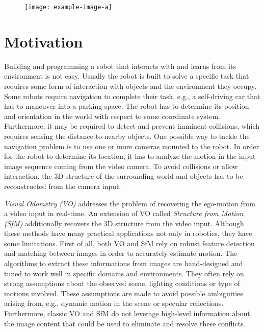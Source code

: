 	
	\begin{figure}
		\centering
		\texttt{[image: example-image-a]}
		\caption{\label{fig:sfm-example}}
	\end{figure}
		
	\section{Motivation}
		
		Building and programming a robot that interacts with and learns from its environment is not easy.
		Usually the robot is built to solve a specific task that requires some form of interaction with objects and the environment they occupy.
		Some robots require navigation to complete their task, e.g., a self-driving car that has to maneuver into a parking space.
		The robot has to determine its position and orientation in the world with respect to some coordinate system.
		Furthermore, it may be required to detect and prevent imminent collisions, which requires sensing the distance to nearby objects.
		One possible way to tackle the navigation problem is to use one or more cameras mounted to the robot.
		In order for the robot to determine its location, it has to analyze the motion in the input image sequence coming from the video camera.
		To avoid collisions or allow interaction, the 3D structure of the surrounding world and objects has to be reconstructed from the camera input.
		
		\emph{Visual Odometry (VO)}  addresses the problem of recovering the ego-motion from a video input in real-time. 
		An extension of VO called \emph{Structure from Motion (SfM)}  additionally recovers the 3D structure from the video input.
		Although these methods have many practical applications not only in robotics, they have some limitations.
		First of all, both VO and SfM rely on robust feature detection and matching between images in order to accurately estimate motion.
		The algorithms to extract these informations from images are hand-designed and tuned to work well in specific domains and environments.
		They often rely on strong assumptions about the observed scene, lighting conditions or type of motions involved.
		These assumptions are made to avoid possible ambiguities arising from, e.g., dynamic motion in the scene or specular reflections.
		Furthermore, classic VO and SfM do not leverage high-level information about the image content that could be used to eliminate and resolve these conflicts.
		
